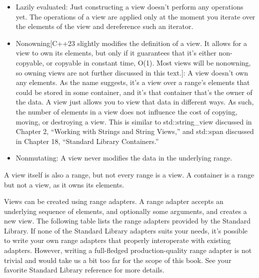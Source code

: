 \begin{itemize}
\item
Lazily evaluated: Just constructing a view doesn’t perform any operations yet. The operations of a view are applied only at the moment you iterate over the elements of the view and dereference such an iterator.

\item
Nonowning[C++23 slightly modifies the definition of a view. It allows for a view to own its elements, but only if it guarantees that it’s either non-copyable, or copyable in constant time, O(1). Most views will be nonowning, so owning views are not further discussed in this text.]: A view doesn’t own any elements. As the name suggests, it’s a view over a range’s elements that could be stored in some container, and it’s that container that’s the owner of the data. A view just allows you to view that data in different ways. As such, the number of elements in a view does not influence the cost of copying, moving, or destroying a view. This is similar to std::string\_view discussed in Chapter 2, “Working with Strings and String Views,” and std::span discussed in Chapter 18, “Standard Library Containers.”

\item
Nonmutating: A view never modifies the data in the underlying range.
\end{itemize}

A view itself is also a range, but not every range is a view. A container is a range but not a view, as it owns its elements.

Views can be created using range adapters. A range adapter accepts an underlying sequence of elements, and optionally some arguments, and creates a new view. The following table lists the range adapters provided by the Standard Library. If none of the Standard Library adapters suits your needs, it’s possible to write your own range adapters that properly interoperate with existing adapters. However, writing a full-fledged production-quality range adapter is not trivial and would take us a bit too far for the scope of this book. See your favorite Standard Library reference for more details.

